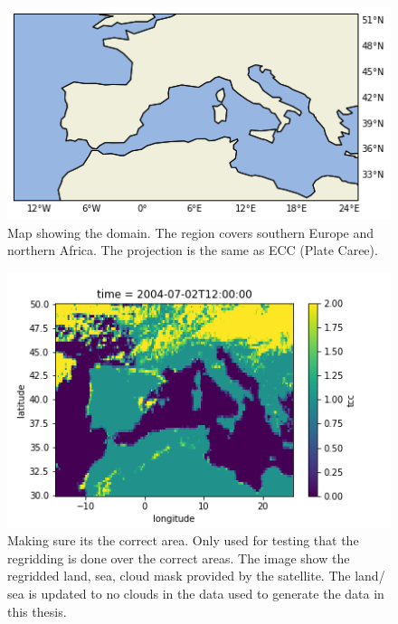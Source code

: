 \begin{figure}[h]
    \centering
    \includegraphics[scale = 0.7]{Chapter4_Results/figurs/Domain.png}
    \caption[Map over domain.]{Map showing the domain. The region covers southern Europe and northern Africa. The projection is the same as ECC (Plate Caree).}
    \label{fig:map}
\end{figure}

\begin{figure}
    \centering
    \includegraphics{Chapter4_Results/figurs/regridded_raw_satelite_image_to_make_sure_its_correcxt_area.png}
    \caption{Making sure its the correct area. Only used for testing that the regridding is done over the correct areas. The image show the regridded land, sea, cloud mask provided by the satellite. The land/ sea is updated to no clouds in the data used to generate the data in this thesis.}
    \label{fig:correct_area}
\end{figure}

